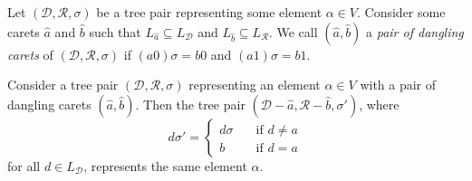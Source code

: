 \documentclass[12pt]{amsart}
\newcommand{\wh}[1]{\widehat{#1}}
\newcommand{\D}{\mathcal{D}}
\newcommand{\R}{\mathcal{R}}
\begin{document}
        \begin{comment}
            We will now show that tree pairs represent a bijection of the Cantor set. Let $(D,R,\sigma)$ be a tree pair and $p \in \mathfrak{C}$. Suppose that $L_D = \{d_1,d_2,...,d_k\}$ and $L_R = \{r_1,r_2,...,r_k\}$. Since $L_D$ is a complete antichain, there exists a unique $d_i \in L_D$ ($1 \leq i \leq k$) and some $x \in \mathfrak{C}$ such that $p = d_ix$. It's clear that the mapping $p \mapsto r_{i\sigma}x$ is a bijection of Cantor space. We define Thompson's Group $V$ to be the group of these bijections with composition and we define $F$ and $T$ in terms of $\sigma$:
        
        
        
        \begin{itemize}
            \item If $t\sigma = t+n \mod k$ ($1 \leq t \leq k$, $n \in \mathbb{Z}$) then $(D,R,\sigma)$ represents an element of $T$.
            \item  If $j\sigma = j$ ($1 \leq j \leq k$) then $(D,R,\sigma)$ represents an element of $F$.
        \end{itemize}
        \end{comment}
        
        \begin{definition}\label{pair-of-dangling-carets}
            \begin{comment}
                Let $(\D,\R,\sigma)$ be a tree pair of some element $\alpha \in V$. Consider some carets $\wh{A}$ of $\D$ rooted at $a \in \{0,1\}^*$ and $\wh{B}$ of $\R$ rooted at $b \in \{0,1\}^*$ with $a0,a1 \in L_\D$ and $b0,b1 \in L_\R$ of $\D$ and $\R$ respectively for some $a,b \in \{0,1\}^*$. We call $(\wh{A},\wh{B})$ \textit{dangling carets} of $(\D,\R,\sigma)$ if $(a0) \sigma = b0$ and $(a1) \sigma = b1$.
            \end{comment}
        
            Let $(\D,\R,\sigma)$ be a tree pair representing some element $\alpha \in V$. Consider some carets $\wh{a}$ and $\wh{b}$ such that $L_{\wh{a}} \subseteq L_\D$ and $L_{\wh{b}} \subseteq L_\R$. We call $(\wh{a},\wh{b})$ a \textit{pair of dangling carets} of $(\D,\R,\sigma)$ if $(a0) \sigma = b0$ and $(a1) \sigma = b1$.
        \end{definition}
        
        \begin{lemma}\label{dangling-carets-delete-same-element}
            Consider a tree pair $(\D,\R,\sigma)$ representing an element $\alpha \in V$ with a pair of dangling carets $(\wh{a},\wh{b})$. Then the tree pair $(\D - \wh{a}, \R - \wh{b}, \sigma')$, where $$d \sigma' = \begin{cases} d \sigma \quad & \text{if } d \neq a \\ b \quad & \text{if } d=a \end{cases}$$ for all $d \in L_\D$, represents the same element $\alpha$. 
        \end{lemma}
        
\end{document}
